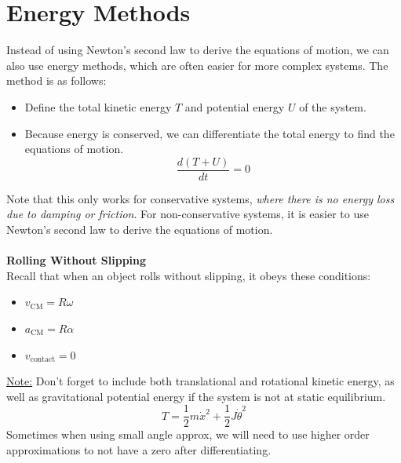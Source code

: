 \documentclass[12pt]{article}
\begin{document}
\section*{Energy Methods}
Instead of using Newton's second law to derive the equations of motion, we can also use energy methods, which are often easier for more complex systems. The method is as follows:
\begin{itemize}
    \item Define the total kinetic energy $T$ and potential energy $U$ of the system.
    \item Because energy is conserved, we can differentiate the total energy to find the equations of motion.
    \[\boxed{\frac{d(T+U)}{dt}=0}\]
\end{itemize}
Note that this only works for conservative systems, \textit{where there is no energy loss due to damping or friction}. For non-conservative systems, it is easier to use Newton's second law to derive the equations of motion.\\\\
\textbf{Rolling Without Slipping}\\
Recall that when an object rolls without slipping, it obeys these conditions:
\begin{itemize}
    \item $v_\text{CM} = R\omega$ 
    \item $a_\text{CM} = R\alpha$
    \item $v_\text{contact} = 0$
\end{itemize}
\underline{Note:} Don't forget to include both translational and rotational kinetic energy, as well as gravitational potential energy if the system is not at static equilibrium.
\[T=\frac{1}{2}m\dot{x}^2+\frac{1}{2}J\dot{\theta}^2\]
Sometimes when using small angle approx, we will need to use higher order approximations to not have a zero after differentiating.
\end{document}
